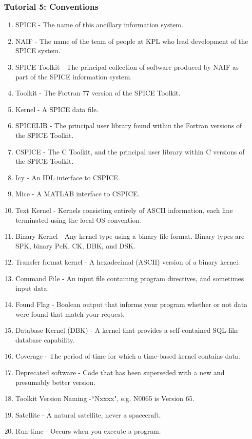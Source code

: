 \documentclass[crop=false,class=book]{standalone}
\begin{document}
            \subsubsection{Tutorial 5: Conventions}
            \begin{enumerate}
                \item SPICE - The name of this ancillary information system.
                \item NAIF - The name of the team of people at KPL who lead development of the SPICE system.
                \item SPICE Toolkit - The principal collection of software produced by NAIF as part of the SPICE information system.
                \item Toolkit - The Fortran 77 version of the SPICE Toolkit.
                \item Kernel - A SPICE data file.
                \item SPICELIB - The principal user library found within the Fortran versions of the SPICE Toolkit.
                \item CSPICE - The C Toolkit, and the principal user library within C versions of the SPICE Toolkit.
                \item Icy - An IDL interface to CSPICE.
                \item Mice - A MATLAB interface to CSPICE.
                \item Text Kernel - Kernels consisting entirely of ASCII information, each line terminated using the local OS convention.
                \item Binary Kernel - Any kernel type using a binary file format. Binary types are SPK, binary PcK, CK, DBK, and DSK.
                \item Transfer format kernel - A hexadecimal (ASCII) version of a binary kernel.
                \item Command File - An input file containing program directives, and sometimes input data.
                \item Found Flag - Boolean output that informs your program whether or not data were found that match your request.
                \item Database Kernel (DBK) - A kernel that provides a self-contained SQL-like database capability.
                \item Coverage - The period of time for which a time-based kernel contains data.
                \item Deprecated software - Code that has been superseded with a new and presumably better version.
                \item Toolkit Version Naming -``Nxxxx", e.g. N0065 is Version 65.
                \item Satellite - A natural satellite, never a spacecraft.
                \item Run-time - Occurs when you execute a program.
            \end{enumerate}
\end{document}
